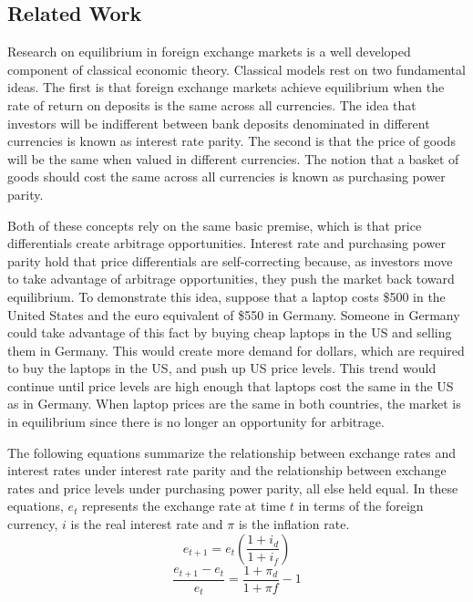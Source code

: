 \documentclass{sig-alternate-05-2015}
\begin{document}
\subsection{Related Work}
Research on equilibrium in foreign exchange markets is a well developed component of classical economic theory. Classical models rest on two fundamental ideas. The first is that foreign exchange markets achieve equilibrium when the rate of return on deposits is the same across all currencies. The idea that investors will be indifferent between bank deposits denominated in different currencies is known as interest rate parity. The second is that the price of goods will be the same when valued in different currencies. The notion that a basket of goods should cost the same across all currencies is known as purchasing power parity.
\par{} Both of these concepts rely on the same basic premise, which is that price differentials create arbitrage opportunities. Interest rate and purchasing power parity hold that price differentials are self-correcting because, as investors move to take advantage of arbitrage opportunities, they push the market back toward equilibrium. To demonstrate this idea, suppose that a laptop costs \$500 in the United States and the euro equivalent of \$550 in Germany. Someone in Germany could take advantage of this fact by buying cheap laptops in the US and selling them in Germany. This would create more demand for dollars, which are required to buy the laptops in the US, and push up US price levels. This trend would continue until price levels are high enough that laptops cost the same in the US as in Germany. When laptop prices are the same in both countries, the market is in equilibrium since there is no longer an opportunity for arbitrage.
\par{} The following equations summarize the relationship between exchange rates and interest rates under interest rate parity and the relationship between exchange rates and price levels under purchasing power parity, all else held equal. In these equations, $e_{t}$ represents the exchange rate at time $t$ in terms of the foreign currency, $i$ is the real interest rate and $\pi$ is the inflation rate. 
\begin{equation}
e_{t+1} = e_{t} \left( \frac{1+i_{d}}{1+i_{f}} \right)
\end{equation}
\begin{equation}
\frac{e_{t+1}-e_{t}}{e_{t}} = \frac{1+\pi_{d}}{1+\pi{f}} - 1
\end{equation}
\end{document}
